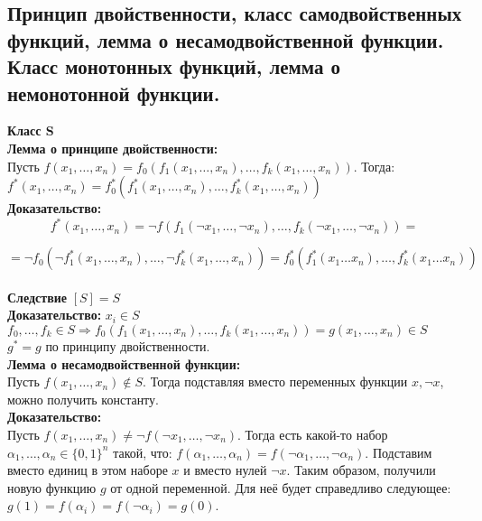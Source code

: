 \subsection{Принцип двойственности, класс самодвойственных функций, лемма о несамодвойственной функции. Класс монотонных функций, лемма о немонотонной функции.}
\textbf{Класс S}\\

\textbf{Лемма о принципе двойственности:}\\

Пусть $f(x_1,\ldots,x_n) = f_0(f_1(x_1,\ldots,x_n),\ldots,f_k(x_1,\ldots,x_n))$. Тогда:
$f^*(x_1,\ldots,x_n) = f_0^*(f_1^*(x_1,\ldots,x_n),\ldots,f_k^*(x_1,\ldots,x_n))$\\

\noindent \textbf{Доказательство:}\\

$$f^*(x_1,\ldots,x_n) = \neg f(f_1(\neg x_1, \ldots, \neg x_n), \ldots, f_k(\neg x_1, \ldots, \neg x_n)) = $$

$$= \neg f_0(\neg f_1^*(x_1, \ldots, x_n), \ldots, \neg f_k^*(x_1, \ldots, x_n)) = f_0^*(f_1^*(x_1 \ldots x_n), \ldots, f_k^*(x_1 \ldots x_n))$$\\

\textbf{Следствие} $[S] = S$\\

\noindent \textbf{Доказательство:} $x_i \in S$\\

$f_0,\ldots,f_k \in S \Rightarrow f_0(f_1(x_1,\ldots,x_n),\ldots,f_k(x_1,\ldots,x_n)) = g(x_1,\ldots,x_n) \in S$\\

$g^* = g$ по принципу двойственности.\\

\textbf{Лемма о несамодвойственной функции:}\\

Пусть $f(x_1, \ldots, x_n) \notin S$. Тогда подставляя вместо переменных функции $x, \neg x$, можно получить константу.\\

\noindent \textbf{Доказательство:}\\

Пусть $f(x_1,\ldots,x_n) \neq \neg f(\neg x_1, \ldots, \neg x_n)$. Тогда есть какой-то набор $\alpha_1, \ldots, \alpha_n \in \{0, 1\}^n$ такой, что:
$f(\alpha_1, \ldots, \alpha_n) = f(\neg \alpha_1, \ldots, \neg \alpha_n)$.
Подставим вместо единиц в этом наборе $x$ и вместо нулей $\neg x$. Таким образом, получили новую функцию $g$ от одной переменной. Для неё будет справедливо следующее:
$g(1) = f(\alpha_i) = f(\neg \alpha_i) = g(0)$.\\

